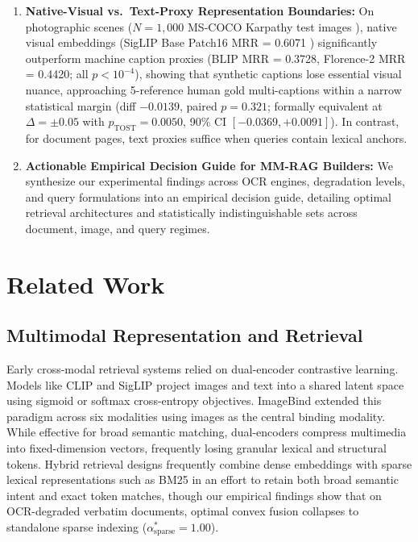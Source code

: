 \begin{enumerate}
    \item \textbf{Native-Visual vs.\ Text-Proxy Representation Boundaries:} On photographic scenes ($N=1{,}000$ MS-COCO Karpathy test images \cite{karpathy2015deep, lin2014coco}), native visual embeddings (SigLIP Base Patch16 MRR = 0.6071 \cite{zhai2023siglip}) significantly outperform machine caption proxies (BLIP MRR = 0.3728, Florence-2 MRR = 0.4420; all $p < 10^{-4}$), showing that synthetic captions lose essential visual nuance, approaching 5-reference human gold multi-captions within a narrow statistical margin (diff $-0.0139$, paired $p=0.321$; formally equivalent at $\Delta=\pm 0.05$ with $p_{\text{TOST}}=0.0050$, 90\% CI $[-0.0369, +0.0091]$). In contrast, for document pages, text proxies suffice when queries contain lexical anchors.
    \item \textbf{Actionable Empirical Decision Guide for MM-RAG Builders:} We synthesize our experimental findings across OCR engines, degradation levels, and query formulations into an empirical decision guide, detailing optimal retrieval architectures and statistically indistinguishable sets across document, image, and query regimes.
\end{enumerate}

\section{Related Work}
\label{sec:related_work}

\subsection{Multimodal Representation and Retrieval}
Early cross-modal retrieval systems relied on dual-encoder contrastive learning. Models like CLIP \cite{radford2021clip} and SigLIP \cite{zhai2023siglip} project images and text into a shared latent space using sigmoid or softmax cross-entropy objectives. ImageBind \cite{girdhar2023imagebind} extended this paradigm across six modalities using images as the central binding modality. While effective for broad semantic matching, dual-encoders compress multimedia into fixed-dimension vectors, frequently losing granular lexical and structural tokens. Hybrid retrieval designs frequently combine dense embeddings with sparse lexical representations such as BM25 \cite{robertson2009bm25, robertson1995okapi} in an effort to retain both broad semantic intent and exact token matches, though our empirical findings show that on OCR-degraded verbatim documents, optimal convex fusion collapses to standalone sparse indexing ($\alpha_{\text{sparse}}^* = 1.00$).

